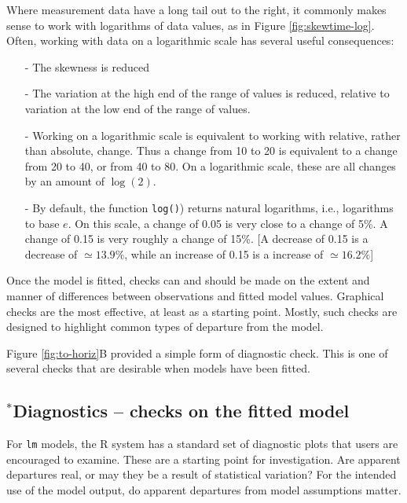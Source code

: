 \documentclass{tufte-book}\usepackage[]{graphicx}\usepackage[]{color}
\newcommand{\txtt}[1]{\texttt{#1}}
\begin{document}
Where measurement data have a long tail out to the right, it
commonly makes sense to work with logarithms of data values, as in Figure
\ref{fig:skewtime-log}.  Often, working with data on a logarithmic
scale has several useful consequences:
\begin{itemize}
  \item[-] The skewness is reduced
  \item[-] The variation at the high end of the range of values is reduced,
    relative to variation at the low end of the range of values.
  \item[-] Working on a logarithmic scale is equivalent to working
    with relative, rather than absolute, change.  Thus a change from
    10 to 20 is equivalent to a change from 20 to 40, or from 40 to 80.
    On a logarithmic scale, these are all changes by an amount of
    $\log(2)$.
  \item[-] By default, the function \txtt{log()}) returns natural
    logarithms, i.e., logarithms to base $e$.  On this scale, a change
    of 0.05 is very close to a change of 5\%.  A change of 0.15 is
    very roughly a change of 15\%.  [A decrease of 0.15 is a decrease
    of $\simeq 13.9\%$, while an increase of 0.15 is a increase of
    $\simeq 16.2\%$]
\end{itemize}

Once the model is fitted, checks can and should be made on the extent
and manner of differences between observations and fitted model
values.  Graphical checks are the most effective, at least as a starting
point. Mostly, such checks are designed to highlight common types of
departure from the model.

Figure \ref{fig:to-horiz}B provided a simple form of diagnostic check.
This is one of several checks that are desirable when models
have been fitted.

\subsection{$^*$Diagnostics -- checks on the fitted model}\label{ss:diag}

For \texttt{lm} models, the R system has a standard set of diagnostic
plots that users are encouraged to examine.  These are a starting
point for investigation. Are apparent departures real, or may they be a
result of statistical variation?  For the intended use of the model
output, do apparent departures from model assumptions matter.
\end{document}
